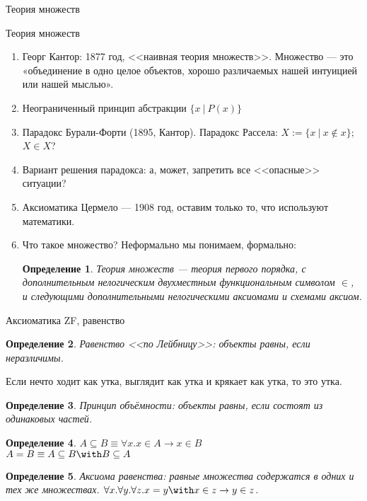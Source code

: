 \documentclass[aspectratio=169]{beamer}
\newtheorem{dfn}{Определение}[section]
\begin{document}
\newcommand\doubleplus{+\kern-1.3ex+\kern0.8ex}
\newcommand\mdoubleplus{\ensuremath{\mathbin{+\mkern-10mu+}}}

\begin{frame}{}
\LARGE\begin{center}Теория множеств\end{center}
\end{frame}

\begin{frame}{Теория множеств}
\begin{enumerate}
\item Георг Кантор: 1877 год, <<наивная теория множеств>>. Множество --- это «объединение в одно
целое объектов, хорошо различаемых нашей интуицией или нашей мыслью».\pause
\item Неограниченный принцип абстракции $\{ x\ |\ P(x)\}$ \pause
\item Парадокс Бурали-Форти (1895, Кантор). Парадокс Рассела: $X := \{ x\ |\ x \notin x\}$; $X\in X$?\pause
\item Вариант решения парадокса: а, может, запретить все <<опасные>> ситуации? \pause
\item Аксиоматика Цермело --- 1908 год, оставим только то, что используют математики. \pause
\item Что такое множество? Неформально мы понимаем, формально:\pause

\begin{dfn} Теория множеств --- теория первого порядка,
с дополнительным нелогическим двухместным функциональным символом $\in$, и следующими 
дополнительными нелогическими аксиомами и схемами аксиом.
\end{dfn}
\end{enumerate}
\end{frame}

\begin{frame}{Аксиоматика ZF, равенство}
\begin{dfn} Равенство <<по Лейбницу>>: объекты равны, если неразличимы.\end{dfn} Если нечто ходит как утка, выглядит как 
утка и крякает как утка, то это утка.\pause
\begin{dfn} Принцип объёмности: объекты равны, если состоят из одинаковых частей.\end{dfn}\pause

\begin{dfn} $A \subseteq B \equiv \forall x.x \in A \rightarrow x \in B$ \\\pause
 $A = B \equiv A \subseteq B \with B \subseteq A$ \end{dfn}\pause
\begin{dfn} Аксиома равенства: равные множества содержатся в одних и тех же множествах. 
$\forall x. \forall y. \forall z. x = y \with x \in z \rightarrow y \in z$.
\end{dfn}
\end{frame}
\end{document}
